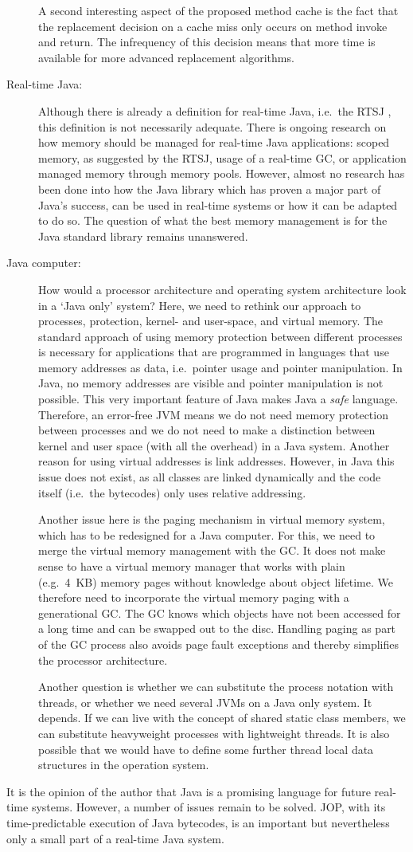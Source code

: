 \begin{description}
A second interesting aspect of the proposed method cache is the fact
that the replacement decision on a cache miss only occurs on method
invoke and return. The infrequency of this decision means that more
time is available for more advanced replacement algorithms.


    \item[Real-time Java:]
Although there is already a definition for real-time Java, i.e.\ the
RTSJ \cite{rtsj}, this definition is not necessarily adequate. There
is ongoing research on how memory should be managed for real-time
Java applications: scoped memory, as suggested by the RTSJ, usage of
a real-time GC, or application managed memory through memory pools.
However, almost no research has been done into how the Java library
which has proven a major part of Java's success, can be used in
real-time systems or how it can be adapted to do so. The question of
what the best memory management is for the Java standard library
remains unanswered.

    \item[Java computer:]
How would a processor architecture and operating system architecture
look in a `Java only' system? Here, we need to rethink our approach
to processes, protection, kernel- and user-space, and virtual
memory. The standard approach of using memory protection between
different processes is necessary for applications that are
programmed in languages that use memory addresses as data, i.e.\
pointer usage and pointer manipulation. In Java, no memory addresses
are visible and pointer manipulation is not possible. This very
important feature of Java makes Java a \emph{safe} language.
Therefore, an error-free JVM means we do not need memory protection
between processes and we do not need to make a distinction between
kernel and user space (with all the overhead) in a Java system.
Another reason for using virtual addresses is link addresses.
However, in Java this issue does not exist, as all classes are
linked dynamically and the code itself (i.e.\ the bytecodes) only
uses relative addressing.

Another issue here is the paging mechanism in virtual memory system,
which has to be redesigned for a Java computer. For this, we need to
merge the virtual memory management with the GC. It does not make
sense to have a virtual memory manager that works with plain (e.g.\
4~KB) memory pages without knowledge about object lifetime. We
therefore need to incorporate the virtual memory paging with a
generational GC. The GC knows which objects have not been accessed
for a long time and can be swapped out to the disc. Handling paging
as part of the GC process also avoids page fault exceptions and
thereby simplifies the processor architecture.

Another question is whether we can substitute the process notation
with threads, or whether we need several JVMs on a Java only system.
It depends. If we can live with the concept of shared static class
members, we can substitute heavyweight processes with lightweight
threads. It is also possible that we would have to define some
further thread local data structures in the operation system.

\end{description}
%
It is the opinion of the author that Java is a promising language
for future real-time systems. However, a number of issues remain to
be solved. JOP, with its time-predictable execution of Java
bytecodes, is an important but nevertheless only a small part of a
real-time Java system.
